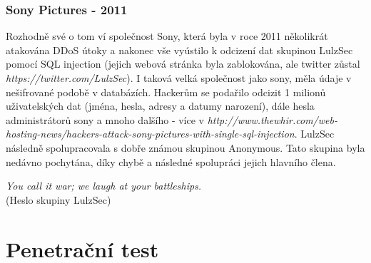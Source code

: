 \documentclass[12pt, a4paper]{report}
\begin{document}
\subsection{Sony Pictures - 2011}
Rozhodně své o tom ví společnost Sony, která byla v roce 2011 několikrát atakována DDoS útoky a nakonec vše vyústilo k odcizení dat skupinou LulzSec pomocí SQL injection (jejich webová stránka byla zablokována, ale twitter zůstal \textit{https://twitter.com/LulzSec}). I taková velká společnost jako sony, měla údaje v nešifrované podobě v databázích. Hackerům se podařilo odcizit 1 milionů uživatelských dat (jména, hesla, adresy a datumy narození), dále hesla administrátorů sony a mnoho dalšího - více v \textit{http://www.thewhir.com/web-hosting-news/hackers-attack-sony-pictures-with-single-sql-injection}. LulzSec následně spolupracovala s dobře známou skupinou Anonymous. Tato skupina byla nedávno pochytána, díky chybě a následné spolupráci jejich hlavního člena.

\begin{center}
\textit{You call it war; we laugh at your battleships.}\\
(Heslo skupiny LulzSec)
\end{center}



\chapter{Penetrační test}
\end{document}
